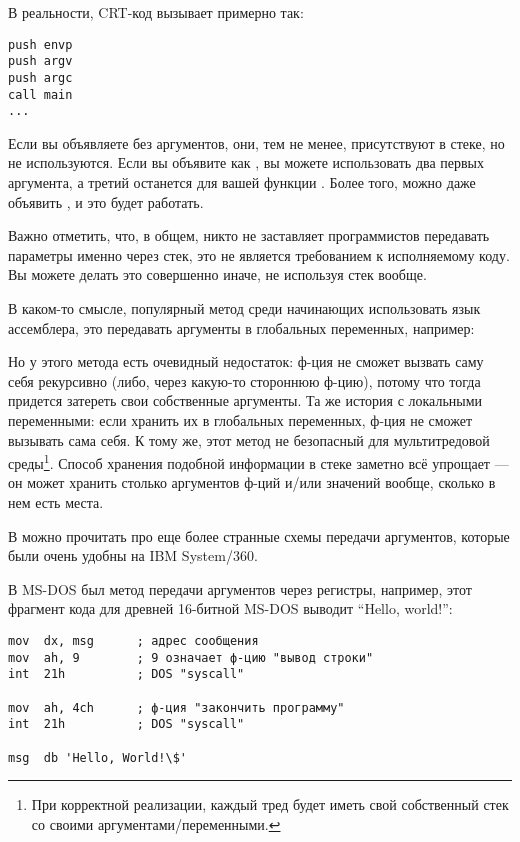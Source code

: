 В реальности, \ac{CRT}-код вызывает \main примерно так:
	
\begin{lstlisting}[style=customasmx86]
push envp
push argv
push argc
call main
...
\end{lstlisting}

Если вы объявляете \main без аргументов, они, тем не менее, присутствуют в стеке, но не используются.
Если вы объявите \main как , 
вы можете использовать два первых аргумента, а третий останется для вашей функции .
Более того, можно даже объявить , и это будет работать.


Важно отметить, что, в общем, никто не заставляет программистов передавать параметры именно через стек, это не является требованием к исполняемому коду.
Вы можете делать это совершенно иначе, не используя стек вообще.

В каком-то смысле, популярный метод среди начинающих использовать язык ассемблера,
это передавать аргументы в глобальных переменных, например:



Но у этого метода есть очевидный недостаток: ф-ция  не сможет вызвать саму себя рекурсивно (либо, через
какую-то стороннюю ф-цию),
потому что тогда придется затереть свои собственные аргументы.
Та же история с локальными переменными: если хранить их в глобальных переменных, ф-ция не сможет вызывать сама себя.
К тому же, этот метод не безопасный для мультитредовой среды\footnote{При корректной реализации,
каждый тред будет иметь свой собственный стек со своими аргументами/переменными.}.
Способ хранения подобной информации в стеке заметно всё упрощает ---
он может хранить столько аргументов ф-ций и/или значений вообще,
сколько в нем есть места.

В  можно прочитать про еще более странные схемы передачи аргументов,
которые были очень удобны на IBM System/360.


В MS-DOS был метод передачи аргументов через регистры, например, этот фрагмент кода для древней 16-битной MS-DOS
выводит ``Hello, world!'':

\begin{lstlisting}[style=customasmx86]
mov  dx, msg      ; адрес сообщения
mov  ah, 9        ; 9 означает ф-цию "вывод строки"
int  21h          ; DOS "syscall"

mov  ah, 4ch      ; ф-ция "закончить программу"
int  21h          ; DOS "syscall"

msg  db 'Hello, World!\$'
\end{lstlisting}

